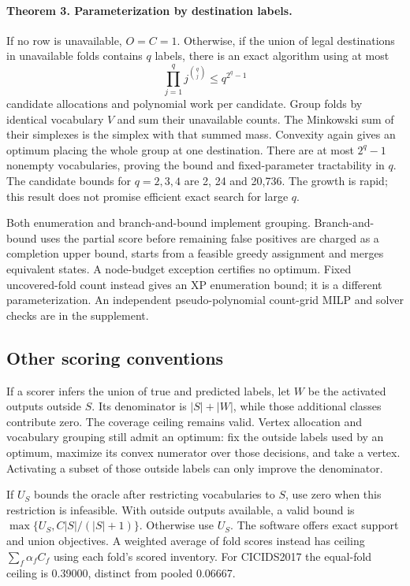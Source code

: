 \documentclass{article}
\begin{document}
\paragraph{Theorem 3. Parameterization by destination labels.}
If no row is unavailable, \(O=C=1\). Otherwise, if the union of legal destinations in unavailable folds contains \(q\) labels, there is an exact algorithm using at most
\[
\prod_{j=1}^{q}j^{\binom{q}{j}}\le q^{2^q-1}
\]
candidate allocations and polynomial work per candidate. Group folds by identical vocabulary \(V\) and sum their unavailable counts. The Minkowski sum of their simplexes is the simplex with that summed mass. Convexity again gives an optimum placing the whole group at one destination. There are at most \(2^q-1\) nonempty vocabularies, proving the bound and fixed-parameter tractability in \(q\). The candidate bounds for \(q=2,3,4\) are 2, 24 and 20,736. The growth is rapid; this result does not promise efficient exact search for large \(q\).

Both enumeration and branch-and-bound implement grouping. Branch-and-bound uses the partial score before remaining false positives are charged as a completion upper bound, starts from a feasible greedy assignment and merges equivalent states. A node-budget exception certifies no optimum. Fixed uncovered-fold count instead gives an XP enumeration bound; it is a different parameterization. An independent pseudo-polynomial count-grid MILP and solver checks are in the supplement.

\subsection{Other scoring conventions}
If a scorer infers the union of true and predicted labels, let \(W\) be the activated outputs outside \(S\). Its denominator is \(|S|+|W|\), while those additional classes contribute zero. The coverage ceiling remains valid. Vertex allocation and vocabulary grouping still admit an optimum: fix the outside labels used by an optimum, maximize its convex numerator over those decisions, and take a vertex. Activating a subset of those outside labels can only improve the denominator.

If \(U_S\) bounds the oracle after restricting vocabularies to \(S\), use zero when this restriction is infeasible. With outside outputs available, a valid bound is \(\max\{U_S,C|S|/(|S|+1)\}\). Otherwise use \(U_S\). The software offers exact support and union objectives. A weighted average of fold scores instead has ceiling \(\sum_f\alpha_fC_f\) using each fold's scored inventory. For CICIDS2017 the equal-fold ceiling is 0.39000, distinct from pooled 0.06667.
\end{document}
